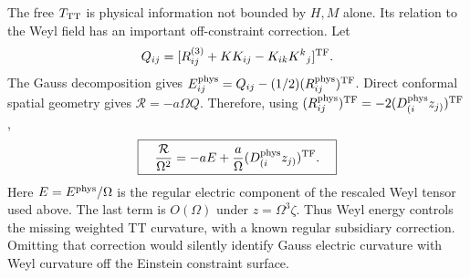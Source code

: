 The free $T_{\rm TT}$ is physical information not bounded by $H,M$ alone.
Its relation to the Weyl field has an important off-constraint correction.
Let
\[
 Q_{ij}=[R^{(3)}_{ij}+K K_{ij}-K_{ik}K^k{}_j]^{\rm TF}.
\]
The Gauss decomposition gives
$E^{\rm phys}_{ij}=Q_{ij}-(1/2)(R^{\rm phys}_{ij})^{\rm TF}$.
Direct conformal spatial geometry gives
$\mathcal R=-a\Omega Q$.  Therefore, using
$(R^{\rm phys}_{ij})^{\rm TF}=-2(D^{\rm phys}_{(i}z_{j)})^{\rm TF}$,
\[
 \boxed{\quad
 \frac{\mathcal R}{\Omega^2}
 =-a E+\frac a\Omega
 (D^{\rm phys}_{(i}z_{j)})^{\rm TF} .\quad}
\]
Here $E=E^{\rm phys}/\Omega$ is the regular electric component of the
rescaled Weyl tensor used above.  The last term is $O(\Omega)$ under
$z=\Omega^3\zeta$.  Thus Weyl energy controls the missing weighted TT
curvature, with a known regular subsidiary correction.  Omitting that
correction would silently identify Gauss electric curvature with Weyl
curvature off the Einstein constraint surface.
